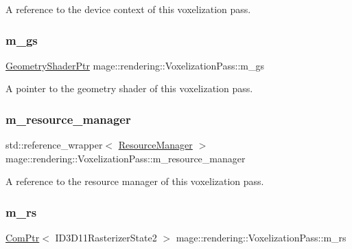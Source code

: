 A reference to the device context of this voxelization pass. \hypertarget{classmage_1_1rendering_1_1_voxelization_pass_ac6161a5ea8a4203c4026afecf90755d4}{}\label{classmage_1_1rendering_1_1_voxelization_pass_ac6161a5ea8a4203c4026afecf90755d4} 
\subsubsection{\texorpdfstring{m\+\_\+gs}{m\_gs}}
{\footnotesize\ttfamily \hyperlink{namespacemage_1_1rendering_aa5d63f80f9483d0896718813768ba1cf}{Geometry\+Shader\+Ptr} mage\+::rendering\+::\+Voxelization\+Pass\+::m\+\_\+gs\hspace{0.3cm}{\ttfamily [private]}}

A pointer to the geometry shader of this voxelization pass. \hypertarget{classmage_1_1rendering_1_1_voxelization_pass_aadfa94217df7498078ae49effc6b438b}{}\label{classmage_1_1rendering_1_1_voxelization_pass_aadfa94217df7498078ae49effc6b438b} 
\subsubsection{\texorpdfstring{m\+\_\+resource\+\_\+manager}{m\_resource\_manager}}
{\footnotesize\ttfamily std\+::reference\+\_\+wrapper$<$ \hyperlink{classmage_1_1rendering_1_1_resource_manager}{Resource\+Manager} $>$ mage\+::rendering\+::\+Voxelization\+Pass\+::m\+\_\+resource\+\_\+manager\hspace{0.3cm}{\ttfamily [private]}}

A reference to the resource manager of this voxelization pass. \hypertarget{classmage_1_1rendering_1_1_voxelization_pass_a0b92de6ef466e697204af0bc5907fcc8}{}\label{classmage_1_1rendering_1_1_voxelization_pass_a0b92de6ef466e697204af0bc5907fcc8} 
\subsubsection{\texorpdfstring{m\+\_\+rs}{m\_rs}}
{\footnotesize\ttfamily \hyperlink{namespacemage_ae74f374780900893caa5555d1031fd79}{Com\+Ptr}$<$ I\+D3\+D11\+Rasterizer\+State2 $>$ mage\+::rendering\+::\+Voxelization\+Pass\+::m\+\_\+rs\hspace{0.3cm}{\ttfamily [private]}}

